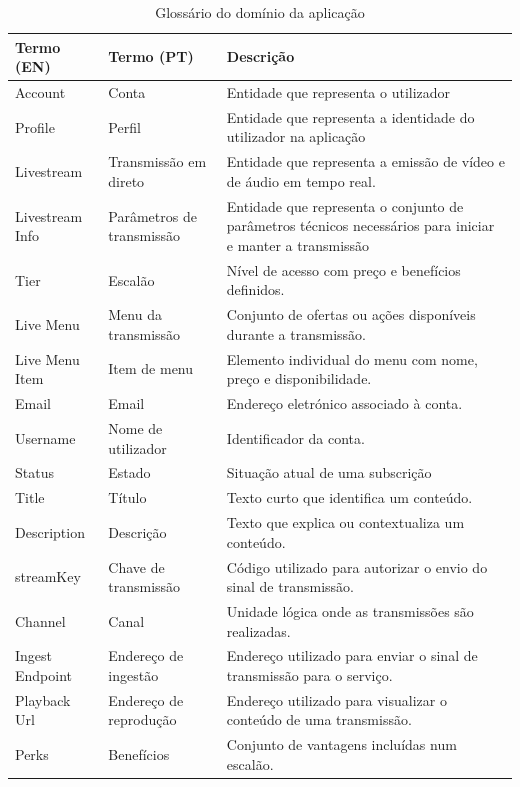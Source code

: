 \begin{table}[H]
\small
\caption{Glossário do domínio da aplicação}
\label{tab:glossario-bilingue-generico}
\begin{center}
\begin{tabular}{|p{3.2cm}|p{3.2cm}|p{6cm}|}
\hline
\textbf{Termo (EN)} & \textbf{Termo (PT)} & \textbf{Descrição} \\ \hline
Account & Conta & Entidade que representa o utilizador \\ \hline
Profile & Perfil & Entidade que representa a identidade do utilizador na aplicação \\ \hline
Livestream & Transmissão em direto & Entidade que representa a emissão de vídeo e de áudio em tempo real. \\ \hline
Livestream Info & Parâmetros de transmissão & Entidade que representa o conjunto de parâmetros técnicos necessários para iniciar e manter a transmissão \\ \hline
Tier & Escalão & Nível de acesso com preço e benefícios definidos. \\ \hline
Live Menu & Menu da transmissão & Conjunto de ofertas ou ações disponíveis durante a transmissão. \\ \hline
Live Menu Item & Item de menu & Elemento individual do menu com nome, preço e disponibilidade. \\ \hline
Email & Email & Endereço eletrónico associado à conta. \\ \hline
Username & Nome de utilizador & Identificador da conta. \\ \hline
Status & Estado & Situação atual de uma subscrição \\ \hline
Title & Título & Texto curto que identifica um conteúdo. \\ \hline
Description & Descrição & Texto que explica ou contextualiza um conteúdo. \\ \hline
streamKey & Chave de transmissão & Código utilizado para autorizar o envio do sinal de transmissão. \\ \hline
Channel & Canal & Unidade lógica onde as transmissões são realizadas. \\ \hline
Ingest Endpoint & Endereço de ingestão & Endereço utilizado para enviar o sinal de transmissão para o serviço. \\ \hline
Playback Url & Endereço de reprodução & Endereço utilizado para visualizar o conteúdo de uma transmissão. \\ \hline
Perks & Benefícios & Conjunto de vantagens incluídas num escalão. \\ \hline
\end{tabular}
\end{center}
\end{table}

